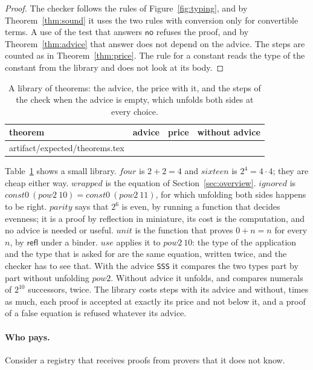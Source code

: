 \documentclass[acmsmall,nonacm,screen]{acmart}
\makeatletter
\newcommand{\kw}[1]{\mathsf{#1}}
\newcommand{\nm}[1]{\mathit{#1}}
\newcommand{\refl}{\kw{refl}}
\newcommand{\no}{\kw{no}}
\newcommand{\adv}[1]{\textup{\texttt{#1}}}
\newcommand{\claim}[2]{#2}
\newcommand{\rows}[1]{\@@input artifact/expected/#1.tex }
\makeatother
\begin{document}
\begin{proof}
The checker follows the rules of Figure~\ref{fig:typing}, and by Theorem~\ref{thm:sound} it
uses the two rules with conversion only for convertible terms. A use of the test that
answers $\no$ refuses the proof, and by Theorem~\ref{thm:advice} that answer does not depend
on the advice. The steps are counted as in Theorem~\ref{thm:price}. The rule for a constant
reads the type of the constant from the library and does not look at its body.
\end{proof}

\begin{table}
\caption{A library of \exTheorems{} theorems: the advice, the price with it, and the steps of
the check when the advice is empty, which unfolds both sides at every choice.}
\label{tab:theorems}
\begin{tabular}{llrr}
\toprule
theorem & advice & price & without advice \\
\midrule
\rows{theorems}
\bottomrule
\end{tabular}
\end{table}

Table~\ref{tab:theorems} shows a small library. $\nm{four}$ is $2 + 2 = 4$ and
$\nm{sixteen}$ is $2^4 = 4 \cdot 4$; they are cheap either way. $\nm{wrapped}$ is the
equation of Section~\ref{sec:overview}. $\nm{ignored}$ is $\nm{const0}\ (\nm{pow2}\ 10) =
\nm{const0}\ (\nm{pow2}\ 11)$, for which unfolding both sides happens to be right.
$\nm{parity}$ says that $2^6$ is even, by running a function that decides evenness; it is a
proof by reflection in miniature, its cost is the computation, and no advice is needed or
useful. $\nm{unit}$ is the function that proves $0 + n = n$ for every $n$, by $\refl$ under a
binder. $\nm{use}$ applies it to $\nm{pow2}\ 10$: the type of the application and the type
that is asked for are the same equation, written twice, and the checker has to see that.
With the advice \adv{SSS} it compares the two types part by part without unfolding
$\nm{pow2}$. Without advice it unfolds, and compares numerals of $2^{10}$ successors, twice.
\claim{theorems}{The library costs \exLibraryPrice{} steps with its advice and
\exLibraryBlind{} without, \exLibraryRatio{} times as much, each proof is accepted at exactly
its price and not below it, and a proof of a false equation is refused whatever its advice.}

\paragraph{Who pays.} Consider a registry that receives proofs from provers that it does not
know.
\end{document}
